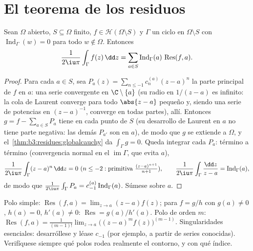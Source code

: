 \section{El teorema de los residuos}

\begin{theorem}\label{thm:b3:residues:residue}
Sean $\Omega$ abierto, $S \subseteq \Omega$ finito, $f \in
\mathcal H(\Omega\setminus S)$ y $\Gamma$ un ciclo en
$\Omega\setminus S$ con $\operatorname{Ind}_\Gamma(w) = 0$ para todo
$w \notin \Omega$. Entonces
\[
\frac{1}{2\iu\pi}\int_\Gamma f(z)\,\dd z
= \sum_{a\in S}\operatorname{Ind}_\Gamma(a)\,
\operatorname{Res}(f, a) .
\]
\end{theorem}

\begin{proof}
Para cada $a \in S$, sea $P_a(z) = \sum_{n\leq-1}c_n^{(a)}(z -
a)^n$ la parte principal de $f$ en $a$: una serie convergente en
$\C\setminus\{a\}$ (su radio en $1/(z-a)$ es infinito: la cola de
Laurent converge para todo $\abs{z-a}$ pequeño y, siendo una serie de
potencias en $(z-a)^{-1}$, converge en todas partes),
 allí. Entonces
$g = f - \sum_{a\in S}P_a$ tiene  en cada punto
de $S$ (su desarrollo de Laurent en $a$ no tiene parte negativa: las
demás $P_{a'}$ son  en $a$),
de modo que $g$ se extiende
 a $\Omega$, y
el~\cref{thm:b3:residues:globalcauchy} da $\int_\Gamma g = 0$. Queda
integrar cada $P_a$: término a término (convergencia normal en el
 $\operatorname{im}\Gamma$,
que evita $a$),
\[
\frac1{2\iu\pi}\int_\Gamma(z - a)^n\,\dd z = 0 \ (n \leq -2:
\text{primitiva } \tfrac{(z-a)^{n+1}}{n+1}),
\qquad
\frac1{2\iu\pi}\int_\Gamma\frac{\dd z}{z - a} =
\operatorname{Ind}_\Gamma(a),
\]
de modo que $\frac1{2\iu\pi}\int_\Gamma P_a =
c_{-1}^{(a)}\operatorname{Ind}_\Gamma(a)$. Súmese sobre $a$.
\end{proof}

\begin{method}\label{met:b3:residues:compute}
Polo simple: $\operatorname{Res}(f, a) = \lim_{z\to a}(z -
a)f(z)$; para $f = g/h$ con $g(a) \neq 0$, $h(a) = 0$, $h'(a)
\neq 0$: $\operatorname{Res} = g(a)/h'(a)$. Polo de orden $m$:
$\operatorname{Res}(f, a) = \frac1{(m-1)!}\lim_{z\to
a}\bigl((z-a)^mf(z)\bigr)^{(m-1)}$. Singularidades esenciales:
desarróllese y léase $c_{-1}$ (por ejemplo, a partir de series
conocidas). Verifíquese siempre qué polos rodea realmente el contorno, y
con qué índice.
\end{method}

